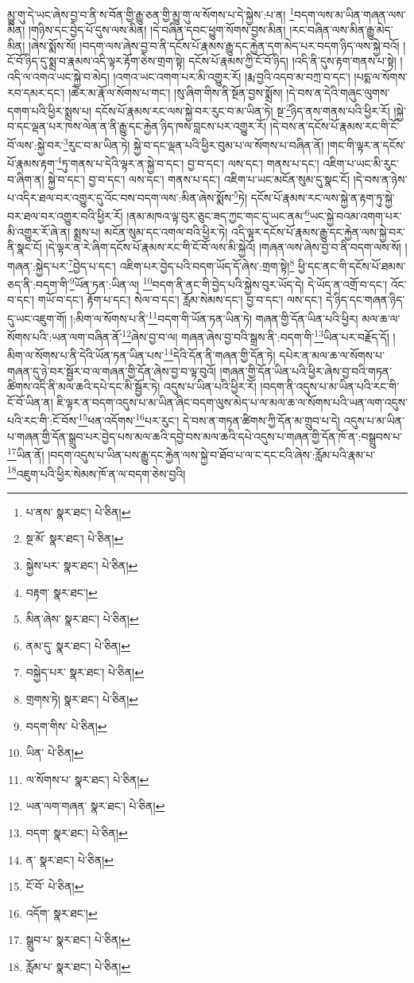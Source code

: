 མྱུ་གུ་དེ་ཡང་ཞེས་བྱ་བ་ནི་ས་བོན་གྱི་རྒྱུ་ཅན་གྱི་མྱུ་གུ་ལ་སོགས་པ་དེ་སྐྱེས་:པ་ན། \footnote{པ་ནས་  སྣར་ཐང་།  པེ་ཅིན། }བདག་ལས་མ་ཡིན་གཞན་ལས་མིན། །གཉིས་དང་བྱེད་པོ་དུས་ལས་མིན། །དེ་བཞིན་དབང་ཕྱུག་སོགས་བྱས་མིན། །རང་བཞིན་ལས་མིན་རྒྱུ་མེད་མིན། །ཞེས་སྨོས་སོ། །བདག་ལས་ཞེས་བྱ་བ་ནི་དངོས་པོ་རྣམས་རྒྱུ་དང་རྐྱེན་དག་མེད་པར་བདག་ཉིད་ལས་སྐྱེ་བའོ། །ངོ་བོ་ཉིད་དུ་སྨྲ་བ་རྣམས་འདི་ལྟར་རྟོག་ཅེས་གྲག་སྟེ། དངོས་པོ་རྣམས་ཀྱི་ངོ་བོ་ཉིད། །འདི་ནི་དུས་རྟག་གནས་པ་སྟེ། །འདི་ལ་འགའ་ཡང་སྐྱེ་བ་མེད། །འགའ་ཡང་འགག་པར་མི་འགྱུར་རོ། །རྨ་བྱའི་འདབ་མ་བཀྲ་བ་དང་། །པདྨ་ལ་སོགས་རབ་དམར་དང་། །ཚེར་མ་རྣོ་ལ་སོགས་པ་གང་། །སུ་ཞིག་གིས་ནི་སྔོན་བྱས་སྨྲོས། །དེ་བས་ན་དེའི་གཞུང་ལུགས་དགག་པའི་ཕྱིར་སྨྲས་པ། དངོས་པོ་རྣམས་རང་ལས་སྐྱེ་བར་རུང་བ་མ་ཡིན་ཏེ། སྔ་\footnote{སྔ་མོ་  སྣར་ཐང་།  པེ་ཅིན། }ཉིད་ནས་གནས་པའི་ཕྱིར་རོ། །སྐྱེ་བ་དང་ལྡན་པར་ཁས་ལེན་ན་ནི་རྒྱུ་དང་རྐྱེན་ཉིད་ཁས་བླངས་པར་འགྱུར་རོ། །དེ་བས་ན་དངོས་པོ་རྣམས་རང་གི་ངོ་བོ་ལས་:སྐྱེ་བར་\footnote{སྐྱེས་པར་  སྣར་ཐང་།  པེ་ཅིན། }རུང་བ་མ་ཡིན་ཏེ། སྐྱེ་བ་དང་ལྡན་པའི་ཕྱིར་བུམ་པ་ལ་སོགས་པ་བཞིན་ནོ། །གང་གི་ལྟར་ན་དངོས་པོ་རྣམས་རྟག་\footnote{བརྟག་  སྣར་ཐང་། }ཏུ་གནས་པ་དེའི་ལྟར་ན་སྐྱེ་བ་དང་། བྱ་བ་དང་། ལས་དང་། གནས་པ་དང་། འཇིག་པ་ཡང་མི་རུང་བ་ཞིག་ན། སྐྱེ་བ་དང་། བྱ་བ་དང་། ལས་དང་། གནས་པ་དང་། འཇིག་པ་ཡང་མངོན་སུམ་དུ་སྣང་ངོ། །དེ་བས་ན་ཉེས་པ་འདིར་ཐལ་བར་འགྱུར་དུ་འོང་བས་བདག་ལས་:མིན་ཞེས་སྨོས་\footnote{མིན་ཞེས་  སྣར་ཐང་།  པེ་ཅིན། }ཏེ། དངོས་པོ་རྣམས་རང་ལས་སྐྱེ་ན་རྟག་ཏུ་སྐྱེ་བར་ཐལ་བར་འགྱུར་བའི་ཕྱིར་རོ། །ནམ་མཁའ་ལྟ་བུར་ཅུང་ཟད་ཀྱང་གང་དུ་ཡང་ནམ་\footnote{ནམ་དུ་  སྣར་ཐང་།  པེ་ཅིན། }ཡང་སྐྱེ་བའམ་འགག་པར་མི་འགྱུར་རོ་ཞེ་ན། སྨྲས་པ། མངོན་སུམ་དང་འགལ་བའི་ཕྱིར་ཏེ། འདི་ལྟར་དངོས་པོ་རྣམས་རྒྱུ་དང་རྐྱེན་ལས་སྐྱེ་བར་ནི་སྣང་ངོ། །དེ་ལྟར་ན་རེ་ཞིག་དངོས་པོ་རྣམས་རང་གི་ངོ་བོ་ལས་མི་སྐྱེའོ། །གཞན་ལས་ཞེས་བྱ་བ་ནི་བདག་ལས་སོ། །གཞན་:སྐྱེད་པར་\footnote{བསྐྱེད་པར་  སྣར་ཐང་།  པེ་ཅིན། }བྱེད་པ་དང་། འཇིག་པར་བྱེད་པའི་བདག་ཡོད་དོ་ཞེས་:གྲག་སྟེ།\footnote{གྲགས་ཏེ།  སྣར་ཐང་།  པེ་ཅིན། } ཕྱི་དང་ནང་གི་དངོས་པོ་ཐམས་ཅད་ནི་:བདག་གི་\footnote{བདག་གིས་  པེ་ཅིན། }ཡོན་ཏན་:ཡིན་ལ། \footnote{ཡིན་  པེ་ཅིན། }བདག་ནི་ནང་གི་བྱེད་པའི་སྐྱེས་བུར་ཡོད་དེ། དེ་ཡོད་ན་འགྲོ་བ་དང་། འོང་བ་དང་། གཡོ་བ་དང་། རྟོག་པ་དང་། སེལ་བ་དང་། རློམ་སེམས་དང་། བྱ་བ་དང་། ལས་དང་། དེ་ཉིད་དང་གཞན་ཉིད་དུ་ཡང་འཇུག་གོ། །:མིག་ལ་སོགས་པ་ནི་\footnote{ལ་སོགས་པ་  སྣར་ཐང་།  པེ་ཅིན། }བདག་གི་ཡོན་ཏན་ཡིན་ཏེ། གཞན་གྱི་དོན་ཡིན་པའི་ཕྱིར། མལ་ཆ་ལ་སོགས་པའི་:ཡན་ལག་བཞིན་ནོ་\footnote{ཡན་ལག་གཞན་  སྣར་ཐང་།  པེ་ཅིན། }ཞེས་བྱ་བ་ལ། གཞན་ཞེས་བྱ་བའི་སྒྲས་ནི་:བདག་གི་\footnote{བདག་  སྣར་ཐང་།  པེ་ཅིན། }ཡིན་པར་བརྗོད་དོ། །མིག་ལ་སོགས་པ་ནི་དེའི་ཡོན་ཏན་ཡིན་པས་\footnote{ན་  སྣར་ཐང་།  པེ་ཅིན། }དེའི་དོན་ནི་གཞན་གྱི་དོན་ཏེ། དཔེར་ན་མལ་ཆ་ལ་སོགས་པ་གཞན་དུ་ཉེ་བར་སྦྱོར་བ་ལ་གཞན་གྱི་དོན་ཞེས་བྱ་བ་ལྟ་བུའོ། །གཞན་གྱི་དོན་ཡིན་པའི་ཕྱིར་ཞེས་བྱ་བའི་གཏན་ཚིགས་འདི་ནི་མལ་ཆའི་དཔེ་དང་མི་སྦྱོར་ཏེ། འདུས་པ་ཡིན་པའི་ཕྱིར་རོ། །བདག་ནི་འདུས་པ་མ་ཡིན་པའི་རང་གི་ངོ་བོ་ཡིན་ན། ཇི་ལྟར་ན་བདག་འདུས་པ་མ་ཡིན་ཞིང་བདག་ལུས་མེད་པ་ལ་མལ་ཆ་ལ་སོགས་པའི་ཡན་ལག་འདུས་པའི་རང་གི་:ངོ་བོས་\footnote{ངོ་བོ་  པེ་ཅིན། }ཕན་འདོགས་\footnote{འདོག་  སྣར་ཐང་། }པར་རུང་། དེ་བས་ན་གཏན་ཚིགས་ཀྱི་དོན་མ་གྲུབ་པ་དེ། འདུས་པ་མ་ཡིན་པ་གཞན་གྱི་དོན་སྒྲུབ་པར་བྱེད་པས་མལ་ཆའི་དབྱེ་བས་མལ་ཆའི་དཔེ་འདུས་པ་གཞན་གྱི་དོན་ཁོ་ན་:བསྒྲུབས་པ་\footnote{སྒྲུབ་པ་  སྣར་ཐང་།  པེ་ཅིན། }ཡིན་ནོ། །བདག་འདུས་པ་ཡིན་པས་རྒྱུ་དང་རྐྱེན་ལས་སྐྱེ་བ་ཐོབ་པ་ལ་ང་དང་ངའི་ཞེས་:རློམ་པའི་རྣམ་པ་\footnote{རློམ་པ་  སྣར་ཐང་།  པེ་ཅིན། }འཇུག་པའི་ཕྱིར་སེམས་ཁོ་ན་ལ་བདག་ཅེས་བྱའི། 